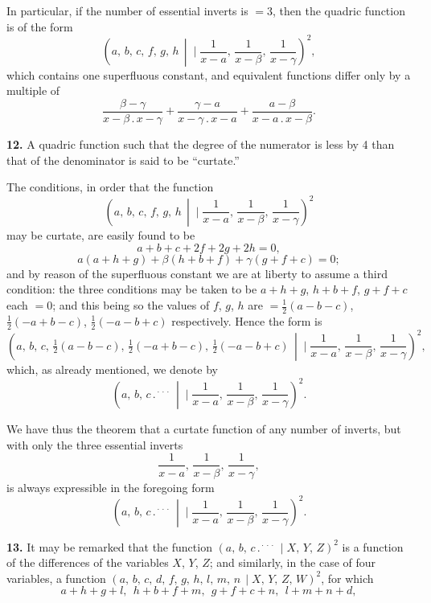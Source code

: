 \documentclass[11pt]{article}
\newcommand{\artno}[1]{\textbf{#1.}\quad}
\begin{document}
\newpage
In particular, if the number of essential inverts is $=3$, then the quadric function is
of the form
\[
   \left(a,\,b,\,c,\,f,\,g,\,h \,\middle|\!\!\!\!\mid \frac{1}{x-a},\,\frac{1}{x-\beta},\,\frac{1}{x-\gamma}\right)^{\!2},
\]
which contains one superfluous constant, and equivalent functions differ only by a
multiple of
\[
   \frac{\beta-\gamma}{x-\beta \,.\, x-\gamma} + \frac{\gamma-a}{x-\gamma \,.\, x-a} + \frac{a-\beta}{x-a \,.\, x-\beta}.
\]

\artno{12} A quadric function such that the degree of the numerator is less by 4 than
that of the denominator is said to be ``curtate.''

The conditions, in order that the function
\[
   \left(a,\,b,\,c,\,f,\,g,\,h \,\middle|\!\!\!\!\mid \frac{1}{x-a},\,\frac{1}{x-\beta},\,\frac{1}{x-\gamma}\right)^{\!2}
\]
may be curtate, are easily found to be
\[
   a + b + c + 2f + 2g + 2h = 0,
\]
\[
   a(a+h+g) + \beta(h+b+f) + \gamma(g+f+c) = 0;
\]
and by reason of the superfluous constant we are at liberty to assume a third condition:
the three conditions may be taken to be $a+h+g$, $h+b+f$, $g+f+c$ each $=0$; and
this being so the values of $f$, $g$, $h$ are $=\tfrac{1}{2}(a-b-c)$, $\tfrac{1}{2}(-a+b-c)$, $\tfrac{1}{2}(-a-b+c)$
respectively. Hence the form is
\[
   \left(a,\,b,\,c,\,\tfrac{1}{2}(a-b-c),\,\tfrac{1}{2}(-a+b-c),\,\tfrac{1}{2}(-a-b+c) \,\middle|\!\!\!\!\mid \frac{1}{x-a},\,\frac{1}{x-\beta},\,\frac{1}{x-\gamma}\right)^{\!2},
\]
which, as already mentioned, we denote by
\[
   \left(a,\,b,\,c \,.{}^{\!\cdot\!\cdot\!\cdot}\,\middle|\!\!\!\!\mid \frac{1}{x-a},\,\frac{1}{x-\beta},\,\frac{1}{x-\gamma}\right)^{\!2}.
\]

We have thus the theorem that a curtate function of any number of inverts, but with
only the three essential inverts
\[
   \frac{1}{x-a},\,\frac{1}{x-\beta},\,\frac{1}{x-\gamma},
\]
is always expressible in the foregoing form
\[
   \left(a,\,b,\,c \,.{}^{\!\cdot\!\cdot\!\cdot}\,\middle|\!\!\!\!\mid \frac{1}{x-a},\,\frac{1}{x-\beta},\,\frac{1}{x-\gamma}\right)^{\!2}.
\]

\artno{13} It may be remarked that the function $(a,\,b,\,c \,.{}^{\!\cdot\!\cdot\!\cdot}\,\mid X,\,Y,\,Z)^{2}$ is a function of
the differences of the variables $X$, $Y$, $Z$; and similarly, in the case of four variables,
a function $(a,\,b,\,c,\,d,\,f,\,g,\,h,\,l,\,m,\,n \,\mid X,\,Y,\,Z,\,W)^{2}$, for which
\[
   a+h+g+l,\ \ h+b+f+m,\ \ g+f+c+n,\ \ l+m+n+d,
\]
\end{document}
